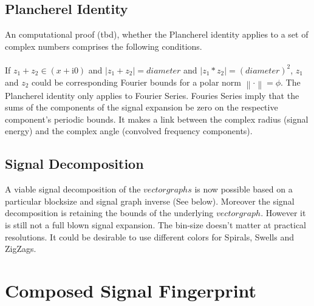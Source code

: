 \documentclass{report}
\newcommand\norm[1]{\left\lVert#1\right\rVert}
\begin{document}
\subsection{Plancherel Identity}
An computational proof (tbd), whether the Plancherel identity applies to a set of complex numbers comprises the following conditions.\\\\
If $z_{1}+z_{2}\in (x+\mathrm{i}0)$ and $\lvert z_{1}+z_{2}\rvert=diameter$ and $\lvert z_{1}*z_{2}\rvert=(diameter)^2$, $z_{1}$ and $z_{2}$ could be corresponding Fourier bounds for a polar norm $\norm{\cdot}=\phi$.
The Plancherel identity only applies to Fourier Series. Fouries Series imply that the sums of the components of the signal expansion be zero on the respective component's periodic bounds. It makes a link between the complex radius (signal energy) and the complex angle (convolved frequency components).
\subsection{Signal Decomposition}
A viable signal decomposition of the $vectorgraphs$ is now possible based on a particular blocksize and signal graph inverse (See below). Moreover the signal decomposition is retaining the bounds of the underlying $vectorgraph$. However it is still not a full blown signal expansion. The bin-size doesn't matter at practical resolutions. It could be desirable to use different colors for Spirals, Swells and ZigZags.

\section{Composed Signal Fingerprint}
\end{document}
